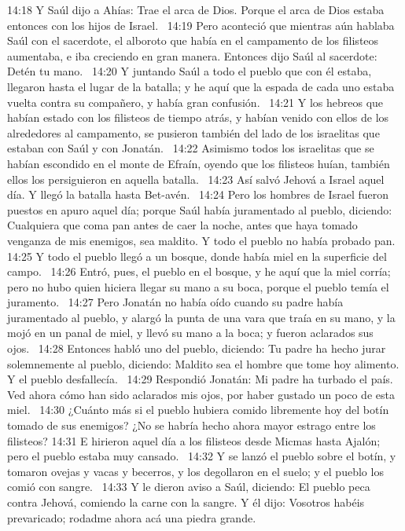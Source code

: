 14:18 Y Saúl dijo a Ahías: Trae el arca de Dios. Porque el arca de Dios estaba entonces con los hijos de Israel.  
14:19 Pero aconteció que mientras aún hablaba Saúl con el sacerdote, el alboroto que había en el campamento de los filisteos aumentaba, e iba creciendo en gran manera. Entonces dijo Saúl al sacerdote: Detén tu mano.  
14:20 Y juntando Saúl a todo el pueblo que con él estaba, llegaron hasta el lugar de la batalla; y he aquí que la espada de cada uno estaba vuelta contra su compañero, y había gran confusión.  
14:21 Y los hebreos que habían estado con los filisteos de tiempo atrás, y habían venido con ellos de los alrededores al campamento, se pusieron también del lado de los israelitas que estaban con Saúl y con Jonatán.  
14:22 Asimismo todos los israelitas que se habían escondido en el monte de Efraín, oyendo que los filisteos huían, también ellos los persiguieron en aquella batalla.  
14:23 Así salvó Jehová a Israel aquel día. Y llegó la batalla hasta Bet-avén.  
14:24 Pero los hombres de Israel fueron puestos en apuro aquel día; porque Saúl había juramentado al pueblo, diciendo: Cualquiera que coma pan antes de caer la noche, antes que haya tomado venganza de mis enemigos, sea maldito. Y todo el pueblo no había probado pan.  
14:25 Y todo el pueblo llegó a un bosque, donde había miel en la superficie del campo.  
14:26 Entró, pues, el pueblo en el bosque, y he aquí que la miel corría; pero no hubo quien hiciera llegar su mano a su boca, porque el pueblo temía el juramento.  
14:27 Pero Jonatán no había oído cuando su padre había juramentado al pueblo, y alargó la punta de una vara que traía en su mano, y la mojó en un panal de miel, y llevó su mano a la boca; y fueron aclarados sus ojos.  
14:28 Entonces habló uno del pueblo, diciendo: Tu padre ha hecho jurar solemnemente al pueblo, diciendo: Maldito sea el hombre que tome hoy alimento. Y el pueblo desfallecía.  
14:29 Respondió Jonatán: Mi padre ha turbado el país. Ved ahora cómo han sido aclarados mis ojos, por haber gustado un poco de esta miel.  
14:30 ¿Cuánto más si el pueblo hubiera comido libremente hoy del botín tomado de sus enemigos? ¿No se habría hecho ahora mayor estrago entre los filisteos? 
14:31 E hirieron aquel día a los filisteos desde Micmas hasta Ajalón; pero el pueblo estaba muy cansado.  
14:32 Y se lanzó el pueblo sobre el botín, y tomaron ovejas y vacas y becerros, y los degollaron en el suelo; y el pueblo los comió con sangre.  
14:33 Y le dieron aviso a Saúl, diciendo: El pueblo peca contra Jehová, comiendo la carne con la sangre. Y él dijo: Vosotros habéis prevaricado; rodadme ahora acá una piedra grande.  
